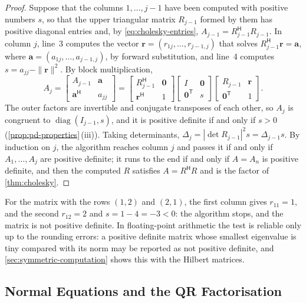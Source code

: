 \begin{proof}
Suppose that the columns $1,\ldots,j-1$ have been computed with positive numbers $s$, so that the upper triangular matrix $R_{j-1}$ formed by them has positive diagonal entries and, by \eqref{eq:cholesky-entries}, $A_{j-1}=R_{j-1}^{\mathsf H}R_{j-1}$. In column $j$, line~3 computes the vector $\mathbf r=(r_{1j},\ldots,r_{j-1,j})$ that solves $R_{j-1}^{\mathsf H}\mathbf r=\mathbf a$, where $\mathbf a=(a_{1j},\ldots,a_{j-1,j})$, by forward substitution, and line~4 computes $s=a_{jj}-\|\mathbf r\|^2$. By block multiplication,
\[
A_j=\begin{bmatrix}A_{j-1}&\mathbf a\\\mathbf a^{\mathsf H}&a_{jj}\end{bmatrix}=\begin{bmatrix}R_{j-1}^{\mathsf H}&\mathbf 0\\\mathbf r^{\mathsf H}&1\end{bmatrix}\begin{bmatrix}I&\mathbf 0\\\mathbf 0^{\mathsf T}&s\end{bmatrix}\begin{bmatrix}R_{j-1}&\mathbf r\\\mathbf 0^{\mathsf T}&1\end{bmatrix}.
\]
The outer factors are invertible and conjugate transposes of each other, so $A_j$ is congruent to $\operatorname{diag}(I_{j-1},s)$, and it is positive definite if and only if $s>0$ (\cref{prop:pd-properties}\,(iii)). Taking determinants, $\Delta_j=|\det R_{j-1}|^2s=\Delta_{j-1}s$. By induction on $j$, the algorithm reaches column $j$ and passes it if and only if $A_1,\ldots,A_j$ are positive definite; it runs to the end if and only if $A=A_n$ is positive definite, and then the computed $R$ satisfies $A=R^{\mathsf H}R$ and is the factor of \cref{thm:cholesky}.
\end{proof}

For the matrix with the rows $(1,2)$ and $(2,1)$, the first column gives $r_{11}=1$, and the second $r_{12}=2$ and $s=1-4=-3<0$: the algorithm stops, and the matrix is not positive definite. In floating-point arithmetic the test is reliable only up to the rounding errors: a positive definite matrix whose smallest eigenvalue is tiny compared with its norm may be reported as not positive definite, and \cref{sec:symmetric-computation} shows this with the Hilbert matrices.

\subsection{Normal Equations and the QR Factorisation}

